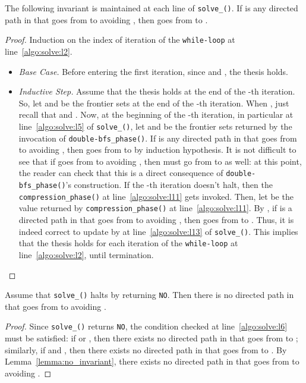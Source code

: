 \begin{lemma}\label{lemma:no_invariant}
The following invariant is maintained at each line of \texttt{solve\_\mainproblem()}.
If  is any directed path in  that goes from  to  avoiding  ,
then  goes from  to .
\end{lemma}
\begin{proof}
Induction on the index  of iteration of the \texttt{while-loop} at line~\ref{algo:solve:l2}.
\begin{itemize}
\item \emph{Base Case.} Before entering the first iteration,
since  and , the thesis holds.
\item \emph{Inductive Step.} Assume that the thesis holds at the end of the -th iteration.
So, let  and  be the frontier sets at the end of the -th iteration.
When , just recall that  and .
Now, at the beginning of the -th iteration,
in particular at line~\ref{algo:solve:l5} of \texttt{solve\_\mainproblem()},
let  and  be the frontier sets returned by the invocation of \texttt{double-bfs\_phase()}.
If  is any directed path in  that goes from  to  avoiding ,
then  goes from  to  by induction hypothesis.
It is not difficult to see that if  goes from  to  avoiding ,
then  must go from  to  as well:
at this point, the reader can check that this is
a direct consequence of \texttt{double-bfs\_phase()}'s construction.
If the -th iteration doesn't halt,
then the \texttt{compression\_phase()} at line~\ref{algo:solve:l11} gets invoked.
Then, let  be the value returned by \texttt{compression\_phase()} at line~\ref{algo:solve:l11}.
By ,
if  is a directed path in  that goes from  to  avoiding , then  goes from  to .
Thus, it is indeed correct to update  by  at line~\ref{algo:solve:l13} of \texttt{solve\_\mainproblem()}.
This implies that the thesis holds for each iteration of the \texttt{while-loop} at line~\ref{algo:solve:l2},
until termination.
\end{itemize}
\end{proof}

\begin{proposition}\label{prop:correctness_no}
Assume that \texttt{solve\_\mainproblem()} halts by returning \texttt{NO}.
Then there is no directed path in  that goes from  to  avoiding .
\end{proposition}
\begin{proof}
Since \texttt{solve\_\mainproblem()} returns \texttt{NO},
the condition checked at line~\ref{algo:solve:l6} must be satisfied:
if  or , then there exists no directed path in  that goes from  to ;
similarly, if  and ,
then there exists no directed path in  that goes from  to .
By Lemma~\ref{lemma:no_invariant},
there exists no directed path in  that goes from  to  avoiding .
\end{proof}

